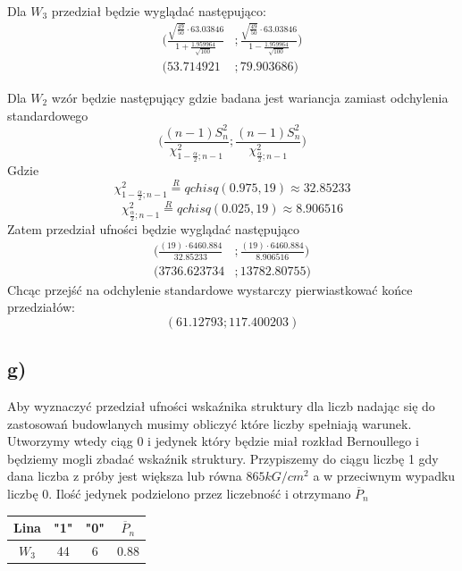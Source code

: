 \documentclass{article}
\begin{document}
Dla $W_3$ przedział będzie wyglądać następująco:
\begin{align*}
\Big( \frac{\sqrt{\frac{49}{50}} \cdot 63.03846}{1 + \frac{1.959964}{\sqrt{100}} } & ; \frac{\sqrt{\frac{49}{50}} \cdot 63.03846}{1 - \frac{1.959964}{\sqrt{100}} } \Big) \\
( 53.714921 &; 79.903686 )
\end{align*}

Dla $W_2$ wzór będzie następujący gdzie badana jest wariancja zamiast odchylenia standardowego
\[ \Big( \frac{(n-1)S_n^2}{\chi^2_{1-\frac{\alpha}{2};n-1}} ; \frac{(n-1)S_n^2}{\chi^2_{\frac{\alpha}{2};n-1}} \Big) \]
Gdzie
\[ \chi^2_{1-\frac{\alpha}{2};n-1} \overset{R}{=} qchisq(0.975, 19) \approx 32.85233 \]
\[ \chi^2_{\frac{\alpha}{2};n-1} \overset{R}{=} qchisq(0.025, 19) \approx 8.906516 \]
Zatem przedział ufności będzie wyglądać następująco
\begin{align*}
\Big( \frac{(19) \cdot 6460.884}{32.85233} &; \frac{(19) \cdot 6460.884}{8.906516} \Big) \\
( 3736.623734 &; 13782.80755 )
\end{align*}
Chcąc przejść na odchylenie standardowe wystarczy pierwiastkować końce przedziałów:
\[ (61.12793 ; 117.400203 ) \]

\subsection{g)}
Aby wyznaczyć przedział ufności wskaźnika struktury dla liczb nadając się  do zastosowań budowlanych musimy obliczyć które liczby spełniają warunek. Utworzymy wtedy ciąg 0 i jedynek który będzie miał rozkład Bernoullego i będziemy mogli zbadać wskaźnik struktury. Przypiszemy do ciągu liczbę 1 gdy dana liczba z próby jest większa lub równa $865 kG/cm^2$ a w przeciwnym wypadku liczbę 0. Ilość jedynek podzielono przez liczebność i otrzymano $\overline{P}_n$
\begin{center} \begin{tabular}{|c|c|c|c|} \hline
Lina & "1" & "0" & $\overline{P}_n$ \\ \hline
$W_3$ & 44 & 6 & 0.88 \\ \hline
\end{tabular} \end{center}
\end{document}

